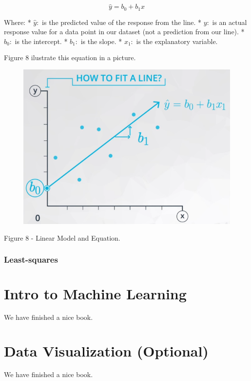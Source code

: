 \documentclass[]{book}
\begin{document}
\[ \hat y = b_0 + b_1x \]

Where: * \(\hat y:\) is the predicted value of the response from the
line. * \(y:\) is an actual response value for a data point in our
dataset (not a prediction from our line). * \(b_0:\) is the intercept. *
\(b_1:\) is the slope. * \(x_1:\) is the explanatory variable.

Figure 8 ilustrate this equation in a picture.

\begin{figure}
\centering
\includegraphics{01-img/c4_l14_08.png}
\caption{}
\end{figure}

Figure 8 - Linear Model and Equation.

\subsection{Least-squares}\label{least-squares}

\chapter{Intro to Machine Learning}\label{intro-to-machine-learning}

We have finished a nice book.

\chapter{Data Visualization
(Optional)}\label{data-visualization-optional}

We have finished a nice book.


\end{document}

